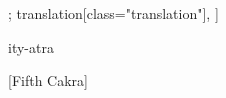 \begin{alignment}[
   texts=edition[class="edition"];
    translation[class="translation"],
  ]
\begin{edition}
\begin{prose}
ity-atra  
\dd{}
\end{prose} \vfill
\nolinenumbers
    \smallskip
    \centerline{\textrm{\small{[Fifth Cakra]}}}
    \bigskip
\linenumbers

\end{edition}
\end{alignment}
